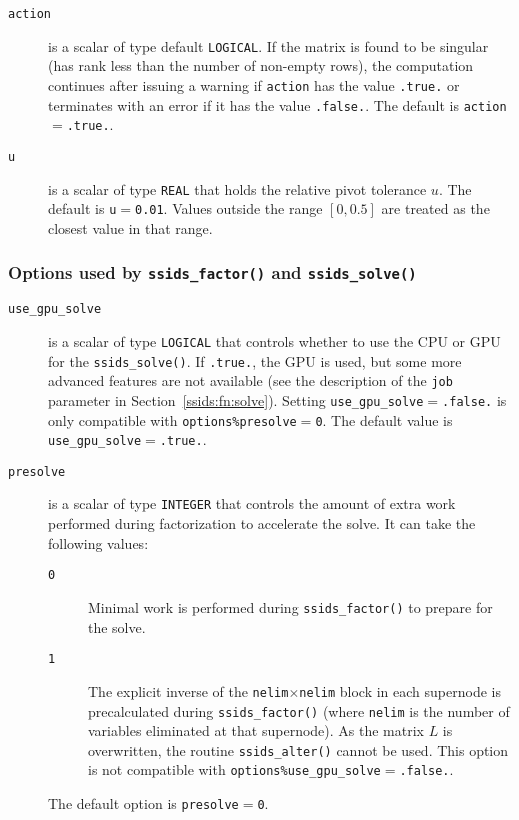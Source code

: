 \begin{description}
\item[\texttt{action}] is a scalar of type default {\tt LOGICAL}.
If the matrix is found to be singular (has rank less than the number of
non-empty rows), the computation continues after issuing a warning if
{\tt action} has the value {\tt .true.} or
terminates with an error if it has the value {\tt .false.}.
The default is {\tt action}$=${\tt .true.}.


\item[\texttt{u}] is a scalar of type {\tt REAL} that holds the relative pivot
tolerance $u$.
The default is {\tt u}$=${\tt 0.01}.
Values outside the range $[0,0.5]$ are treated as the closest value in that range.

\end{description}

\subsubsection*{Options used by {\tt ssids\_factor()} and {\tt ssids\_solve()}}

\begin{description}
\item[\texttt{use\_gpu\_solve}] is a scalar of type {\tt LOGICAL} that controls
   whether to use the CPU or GPU for the \texttt{ssids\_solve()}. If
   \texttt{.true.}, the GPU is used, but some more advanced features are not
   available (see the description of the \texttt{job} parameter in
   Section~\ref{ssids:fn:solve}).
   Setting \texttt{use\_gpu\_solve}$=${\tt .false.} is only compatible with
   \texttt{options\%presolve}$=${\tt 0}.
   The default value is \texttt{use\_gpu\_solve}$=$\texttt{.true.}.
\item[\texttt{presolve}] is a scalar of type {\tt INTEGER} that controls the
   amount of extra work performed during factorization to accelerate the solve.
   It can take the following values:
   \begin{description}
      \item[\texttt{0}] Minimal work is performed during {\tt ssids\_factor()}
         to prepare for the solve.
      \item[\texttt{1}] The explicit inverse of the
         \texttt{nelim}$\times$\texttt{nelim} block in each supernode is
         precalculated during {\tt ssids\_factor()} (where \texttt{nelim} is
         the number of variables eliminated at that supernode). As the matrix
         $L$ is overwritten, the routine {\tt ssids\_alter()} cannot be used.
         This option is not compatible with {\tt options\%use\_gpu\_solve}$=$\texttt{.false.}.
   \end{description}
   The default option is \texttt{presolve}$=$\texttt{0}.
\end{description}

